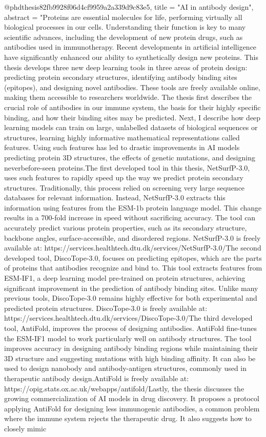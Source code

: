 @phdthesis{82fb9928f06d4cf9959a2a339d9c83e5,
title = "AI in antibody design",
abstract = "Proteins are essential molecules for life, performing virtually all biological processes in our cells. Understanding their function is key to many scientific advances, including the development of new protein drugs, such as antibodies used in immunotherapy. Recent developments in artificial intelligence have significantly enhanced our ability to synthetically design new proteins. This thesis develops three new deep learning tools in three areas of protein design: predicting protein secondary structures, identifying antibody binding sites (epitopes), and designing novel antibodies. These tools are freely available online, making them accessible to researchers worldwide. The thesis first describes the crucial role of antibodies in our immune system, the basis for their highly specific binding, and how their binding sites may be predicted. Next, I describe how deep learning models can train on large, unlabelled datasets of biological sequences or structures, learning highly informative mathematical representations called features. Using such features has led to drastic improvements in AI models predicting protein 3D structures, the effects of genetic mutations, and designing neverbefore-seen proteins.The first developed tool in this thesis, NetSurfP-3.0, uses such features to rapidly speed up the way we predict protein secondary structures. Traditionally, this process relied on screening very large sequence databases for relevant information. Instead, NetSurfP-3.0 extracts this information using features from the ESM-1b protein language model. This change results in a 700-fold increase in speed without sacrificing accuracy. The tool can accurately predict various protein properties, such as its secondary structure, backbone angles, surface-accessible, and disordered regions. NetSurfP-3.0 is freely available at: https://services.healthtech.dtu.dk/services/NetSurfP-3.0/The second developed tool, DiscoTope-3.0, focuses on predicting epitopes, which are the parts of proteins that antibodies recognize and bind to. This tool extracts features from ESM-IF1, a deep learning model pre-trained on protein structures, achieving significant improvement in the prediction of antibody binding sites. Unlike many previous tools, DiscoTope-3.0 remains highly effective for both experimental and predicted protein structures. DiscoTope-3.0 is freely available at: https://services.healthtech.dtu.dk/services/DiscoTope-3.0/The third developed tool, AntiFold, improves the process of designing antibodies. AntiFold fine-tunes the ESM-IF1 model to work particularly well on antibody structures. The tool improves accuracy in designing antibody binding regions while maintaining their 3D structure and suggesting mutations with high binding affinity. It can also be used to design nanobody and antibody-antigen structures, commonly used in therapeutic antibody design.AntiFold is freely available at: https://opig.stats.ox.ac.uk/webapps/antifold/Lastly, the thesis discusses the growing commercialization of AI models in drug discovery. It proposes a protocol applying AntiFold for designing less immunogenic antibodies, a common problem where the immune system rejects the therapeutic drug. It also suggests how to closely mimic }
